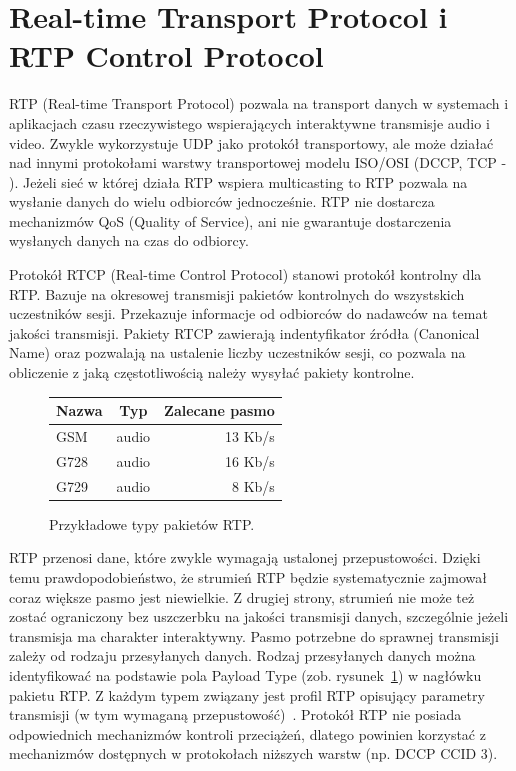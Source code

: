 \section{Real-time Transport Protocol i RTP Control Protocol}

RTP (Real-time Transport Protocol) pozwala na transport danych w systemach i aplikacjach czasu rzeczywistego wspierających interaktywne transmisje audio i video. Zwykle wykorzystuje UDP jako protokół transportowy, ale może działać nad innymi protokołami warstwy transportowej modelu ISO/OSI (DCCP, TCP - \cite{RFC3550, RFC5762}). Jeżeli sieć w której działa RTP wspiera multicasting to RTP pozwala na wysłanie danych do wielu odbiorców jednocześnie. RTP nie dostarcza mechanizmów QoS (Quality of Service), ani nie gwarantuje dostarczenia wysłanych danych na czas do odbiorcy.

Protokół RTCP (Real-time Control Protocol) stanowi protokół kontrolny dla RTP. Bazuje na okresowej transmisji pakietów kontrolnych do wszystskich uczestników sesji. Przekazuje informacje od odbiorców do nadawców na temat jakości transmisji. Pakiety RTCP zawierają indentyfikator źródła (Canonical Name) oraz pozwalają na ustalenie liczby uczestników sesji, co pozwala na obliczenie z jaką częstotliwością należy wysyłać pakiety kontrolne.

\begin{figure}[h!]
	\centering
	\begin{tabular}{ l | c | r }
  		Nazwa & Typ & Zalecane pasmo \\
  		\hline
  		GSM & audio & 13 Kb/s \\
  		G728 & audio & 16 Kb/s  \\
  		G729 & audio & 8 Kb/s  \\
	\end{tabular}
	\caption{Przykładowe typy pakietów RTP.}
	\label{RTP_table}
\end{figure}

RTP przenosi dane, które zwykle wymagają ustalonej przepustowości. Dzięki temu prawdopodobieństwo, że strumień RTP będzie systematycznie zajmował coraz większe pasmo jest niewielkie. Z drugiej strony, strumień nie może też zostać ograniczony bez uszczerbku na jakości transmisji danych, szczególnie jeżeli transmisja ma charakter interaktywny. Pasmo potrzebne do sprawnej transmisji zależy od rodzaju przesyłanych danych. Rodzaj przesyłanych danych można identyfikować na podstawie pola Payload Type (zob. rysunek~\ref{RTP_table}) w nagłówku pakietu RTP. Z każdym typem związany jest profil RTP opisujący parametry transmisji (w tym wymaganą przepustowość)~\cite{RFC3551}. Protokół RTP nie posiada odpowiednich mechanizmów kontroli przeciążeń, dlatego powinien korzystać z mechanizmów dostępnych w protokołach niższych warstw (np. DCCP CCID 3).


